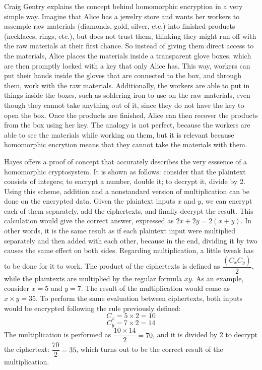 Craig Gentry \cite{homoenc} explains the concept behind homomorphic encryption in a very simple way. Imagine that Alice has a jewelry store and wants her workers to assemple raw materials (diamonds, gold, silver, etc.) into finished products (necklaces, rings, etc.), but does not trust them, thinking they might run off with the raw materials at their first chance. So instead of giving them direct access to the materials, Alice places the materials inside a transparent glove boxes, which are then promptly locked with a key that only Alice has. This way, workers can put their hands inside the gloves that are connected to the box, and through them, work with the raw materials. Additionally, the workers are able to put in things inside the boxes, such as soldering iron to use on the raw materials, even though they cannot take anything out of it, since they do not have the key to open the box. Once the products are finished, Alice can then recover the products from the box using her key. The analogy is not perfect, because the workers are able to see the materials while working on them, but it is relevant because homomorphic encrytion means that they cannot take the materials with them.

Hayes \cite{Hayes2012} offers a proof of concept that accurately describes the very esssence of a homomorphic cryptosystem. It is shown as follows: consider that the plaintext consists of integers; to encrypt a number, double it; to decrypt it, divide by 2. Using this scheme, addition and a nonstandard version of multiplication can be done on the encrypted data. Given the plaintext inputs $x$ and $y$, we can encrypt each of them separately, add the ciphertexts, and finally decrypt the result. This calculation would give the correct answer, expressed as $2x+2y=2(x+y)$. In other words, it is the same result as if each plaintext input were multiplied separately and then added with each other, because in the end, dividing it by two causes the same effect on both sides. 
Regarding multiplication, a little tweak has to be done for it to work. The product of the ciphertexts is defined as $\dfrac{(C_{x} C_{y})}{2}$, while the plaintexts are multiplied by the regular formula $xy$. 
As an example, consider $x=5$ and $y=7$. The result of the multiplication would come as $x \times y = 35$. To perform the same evaluation between ciphertexts, both inputs would be encrypted following the rule previously defined:
\[
C_{x} = 5 \times 2 = 10
\]
\[
C_{y} = 7 \times 2 = 14
\]
The multiplication is performed as $\dfrac{10 \times 14}{2} = 70$, and it is divided by 2 to decrypt the ciphertext: $\dfrac{70}{2} = 35$, which turns out to be the correct result of the multiplication.

